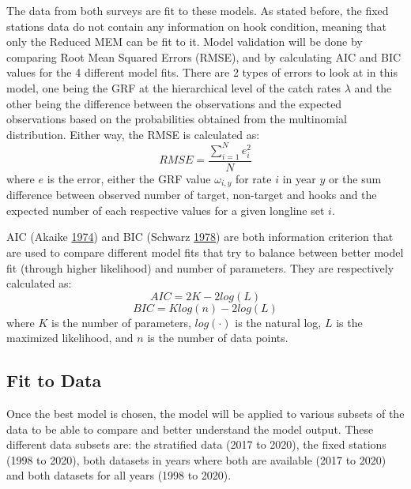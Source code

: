 \documentclass[12pt]{article}\usepackage[]{graphicx}\usepackage[]{color}
\begin{document}
The data from both surveys are fit to these models. As stated before, the fixed stations data do not contain any information on hook condition, meaning that only the Reduced MEM can be fit to it. Model validation will be done by comparing Root Mean Squared Errors (RMSE), and by calculating AIC and BIC values for the 4 different model fits. There are 2 types of errors to look at in this model, one being the GRF at the hierarchical level of the catch rates \(\lambda\) and the other being the difference between the observations and the expected observations based on the probabilities obtained from the multinomial distribution. Either way, the RMSE is calculated as:
\begin{equation}
RMSE = \frac{\sum_{i=1}^N e_i^2}{N}
\end{equation}
where \(e\) is the error, either the GRF value \(\omega_{i,y}\) for rate \(i\) in year \(y\) or the sum difference between observed number of target, non-target and hooks and the expected number of each respective values for a given longline set \(i\).

AIC (Akaike \protect\hyperlink{ref-Akaike1974}{1974}) and BIC (Schwarz \protect\hyperlink{ref-Schwarz1978}{1978}) are both information criterion that are used to compare different model fits that try to balance between better model fit (through higher likelihood) and number of parameters. They are respectively calculated as:
\begin{equation}\label{eq:aic}
AIC = 2K - 2 log(L)
\end{equation} \begin{equation}\label{eq:bic}
BIC = K log(n) - 2 log(L)
\end{equation}
where \(K\) is the number of parameters, \(log(\cdot)\) is the natural log, \(L\) is the maximized likelihood, and \(n\) is the number of data points.

\hypertarget{fit-to-data}{%
\subsection{Fit to Data}\label{fit-to-data}}

Once the best model is chosen, the model will be applied to various subsets of the data to be able to compare and better understand the model output. These different data subsets are: the stratified data (2017 to 2020), the fixed stations (1998 to 2020), both datasets in years where both are available (2017 to 2020) and both datasets for all years (1998 to 2020).
\end{document}
